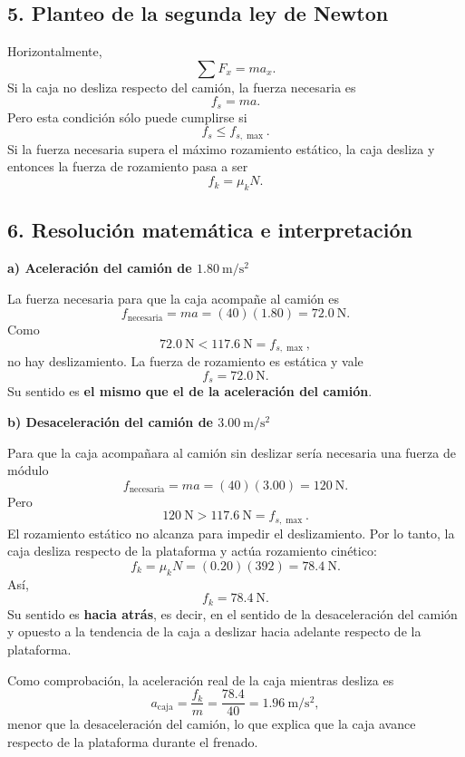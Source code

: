 \documentclass[12pt]{article}
\newcounter{ejercicio}
\newcommand{\paso}[2]{%
  \subsection*{\color{AzulFisica}#1. #2}%
}
\begin{document}
\paso{5}{Planteo de la segunda ley de Newton}
Horizontalmente,
\[
\sum F_x=ma_x.
\]
Si la caja no desliza respecto del camión, la fuerza necesaria es
\[
f_s=ma.
\]
Pero esta condición sólo puede cumplirse si
\[
f_s\leq f_{s,\max}.
\]
Si la fuerza necesaria supera el máximo rozamiento estático, la caja desliza y entonces la fuerza de rozamiento pasa a ser
\[
f_k=\mu_kN.
\]

\paso{6}{Resolución matemática e interpretación}

\textbf{a) Aceleración del camión de $\SI{1.80}{\meter\per\second\squared}$}

La fuerza necesaria para que la caja acompañe al camión es
\[
f_{\text{necesaria}}=ma=(40)(1.80)=\SI{72.0}{\newton}.
\]
Como
\[
\SI{72.0}{\newton}<\SI{117.6}{\newton}=f_{s,\max},
\]
no hay deslizamiento. La fuerza de rozamiento es estática y vale
\[
\boxed{f_s=\SI{72.0}{\newton}}.
\]
Su sentido es \textbf{el mismo que el de la aceleración del camión}.

\textbf{b) Desaceleración del camión de $\SI{3.00}{\meter\per\second\squared}$}

Para que la caja acompañara al camión sin deslizar sería necesaria una fuerza de módulo
\[
f_{\text{necesaria}}=ma=(40)(3.00)=\SI{120}{\newton}.
\]
Pero
\[
\SI{120}{\newton}>\SI{117.6}{\newton}=f_{s,\max}.
\]
El rozamiento estático no alcanza para impedir el deslizamiento. Por lo tanto, la caja desliza respecto de la plataforma y actúa rozamiento cinético:
\[
f_k=\mu_kN=(0.20)(392)=\SI{78.4}{\newton}.
\]
Así,
\[
\boxed{f_k=\SI{78.4}{\newton}}.
\]
Su sentido es \textbf{hacia atrás}, es decir, en el sentido de la desaceleración del camión y opuesto a la tendencia de la caja a deslizar hacia adelante respecto de la plataforma.

Como comprobación, la aceleración real de la caja mientras desliza es
\[
a_{\text{caja}}=\frac{f_k}{m}=\frac{78.4}{40}=\SI{1.96}{\meter\per\second\squared},
\]
menor que la desaceleración del camión, lo que explica que la caja avance respecto de la plataforma durante el frenado.

\vspace{0.5em}
\begin{center}
\end{center}
\end{document}
